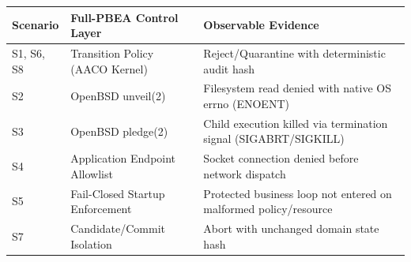 \begin{tabular}{lll}
\toprule
Scenario & Full-PBEA Control Layer & Observable Evidence \\
\midrule
S1, S6, S8 & Transition Policy (AACO Kernel) & Reject/Quarantine with deterministic audit hash \\
S2 & OpenBSD unveil(2) & Filesystem read denied with native OS errno (ENOENT) \\
S3 & OpenBSD pledge(2) & Child execution killed via termination signal (SIGABRT/SIGKILL) \\
S4 & Application Endpoint Allowlist & Socket connection denied before network dispatch \\
S5 & Fail-Closed Startup Enforcement & Protected business loop not entered on malformed policy/resource \\
S7 & Candidate/Commit Isolation & Abort with unchanged domain state hash \\
\bottomrule
\end{tabular}
